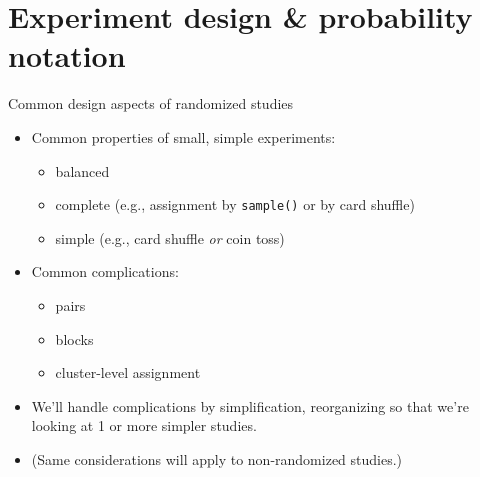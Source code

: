 \section{Experiment design \& probability notation} 


\begin{frame}{Common design aspects of randomized studies} 
  \begin{itemize}
  \item<1-> Common properties of small, simple experiments:
    \begin{itemize}
    \item balanced 
    \item complete (e.g., assignment by \texttt{sample()} or by card shuffle)
    \item simple (e.g., card shuffle \textit{or} coin toss)
    \end{itemize}
  \item<2-> Common complications:
    \begin{itemize}
    \item<2-> pairs
    \item<2-> blocks
    \item<2-> cluster-level assignment
    \end{itemize}
  \item<3-> We'll handle complications by simplification, reorganizing so that we're looking at 1 or more simpler studies.
  \item<4-> (Same considerations will apply to non-randomized studies.)
  \end{itemize}

\end{frame}


